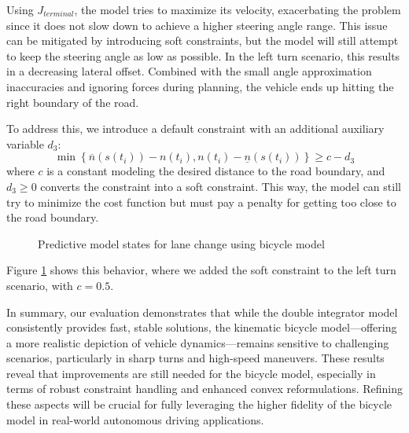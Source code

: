 Using $J_{terminal}$, the model tries to maximize its velocity, exacerbating the problem since it does not slow down to achieve a higher steering
angle range.
This issue can be mitigated by introducing soft constraints, but the model will still attempt to keep the steering angle as low as possible.
In the left turn scenario, this results in a decreasing lateral offset.
Combined with the small angle approximation inaccuracies and ignoring forces during planning, the vehicle ends up hitting the right boundary of the
road.

To address this, we introduce a default constraint with an additional auxiliary variable $d_3$: \[ \min \left\{ \overline{n}(s(t_i)) - n(t_i), n(t_i)
	- \underline{n}(s(t_i)) \right\} \geq c - d_3 \] where $c$ is a constant modeling the desired distance to the road boundary, and $d_3 \geq 0$
converts the constraint into a soft constraint.
This way, the model can still try to minimize the cost function but must pay a penalty for getting too close to the road boundary.
\begin{figure}[h]
	\centering
	\caption{Predictive model states for lane change using bicycle model}
	\label{fig:left_turn_bicycle_model}
\end{figure}
Figure \ref{fig:left_turn_bicycle_model} shows this behavior, where we added the soft constraint to the left turn scenario, with $c=0.5$.

In summary, our evaluation demonstrates that while the double integrator model consistently provides fast, stable solutions, the kinematic bicycle
model—offering a more realistic depiction of vehicle dynamics—remains sensitive to challenging scenarios, particularly in sharp turns and high-speed
maneuvers.
These results reveal that improvements are still needed for the bicycle model, especially in terms of robust constraint handling and enhanced convex
reformulations.
Refining these aspects will be crucial for fully leveraging the higher fidelity of the bicycle model in real-world autonomous driving applications.
